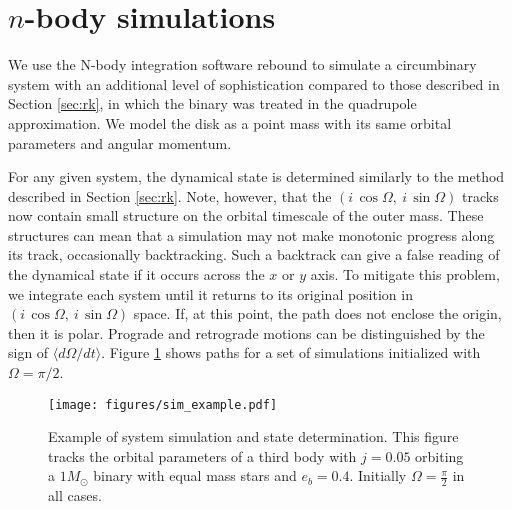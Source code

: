 \documentclass[twocolumn]{aastex631}
\begin{document}
\section{$n$-body simulations}
\label{sec:reb}

We use the N-body integration software {\sc rebound} \citep{rebound} to simulate a circumbinary system with an additional level of sophistication compared to those described in Section \ref{sec:rk}, in which the binary was treated in the quadrupole approximation. We model the disk as a point mass with its same orbital parameters and angular momentum.

For any given system, the dynamical state is determined similarly to the method described in Section \ref{sec:rk}. Note, however, that the $(i\,\cos{\Omega},~i\,\sin{\Omega})$ tracks now contain small structure on the orbital timescale of the outer mass. These structures can mean that a simulation may not make monotonic progress along its track, occasionally backtracking. Such a backtrack can give a false reading of the dynamical state if it occurs across the $x$ or $y$ axis. To mitigate this problem, we integrate each system until it returns to its original position in $(i\,\cos{\Omega},~i\,\sin{\Omega})$ space. If, at this point, the path does not enclose the origin, then it is polar. Prograde and retrograde motions can be distinguished by the sign of $\langle d\Omega/dt \rangle$. Figure \ref{fig:sim_example} shows paths for a set of simulations initialized with $\Omega = \pi/2$.

\begin{figure}
    \begin{centering}
        \texttt{[image: figures/sim\_example.pdf]}
        \caption{Example of system simulation and state determination. This figure tracks the orbital parameters
        of a third body with $j=0.05$ orbiting a $1 M_\odot$ binary with equal mass stars and $e_b = 0.4$.
        Initially $\Omega = \frac{\pi}{2}$ in all cases.}
        \label{fig:sim_example}
    \end{centering}
\end{figure}
\end{document}
